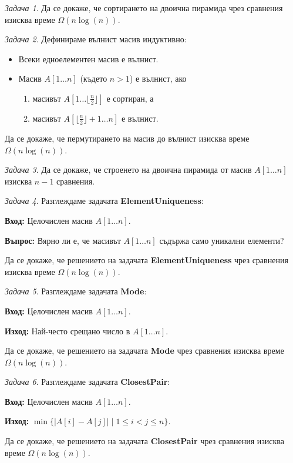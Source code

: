 \documentclass{article}
\theoremstyle{definition}
\theoremstyle{plain}
\theoremstyle{remark}
\newtheorem{problem}{Задача}
\theoremstyle{definition}
\begin{document}
\begin{problem}
Да се докаже, че сортирането на двоична пирамида чрез сравнения изисква време $\Omega(n \log(n))$.
\end{problem}

\begin{problem}
Дефинираме вълнист масив индуктивно:
\begin{itemize}
    \item Всеки едноелементен масив е вълнист.
    \item Масив $A[1 \dots n]$ (където $n > 1$) е вълнист, ако
          \begin{enumerate}
              \item масивът $A[1 \dots \lfloor \frac{n}{2} \rfloor]$ е сортиран, а
              \item масивът $A[\lfloor \frac{n}{2} \rfloor + 1 \dots n]$ е вълнист.
          \end{enumerate}
\end{itemize}
Да се докаже, че пермутирането на масив до вълнист изисква време $\Omega(n \log(n))$.
\end{problem}

\begin{problem}
Да се докаже, че строенето на двоична пирамида от масив $A[1 \dots n]$ изисква $n - 1$ сравнения.
\end{problem}

\begin{problem}
Разглеждаме задачата \textbf{ElementUniqueness}:

\vspace*{2mm}
\textbf{Вход:} Целочислен масив $A[1 \dots n]$.

\textbf{Въпрос:} Вярно ли е, че масивът $A[1 \dots n]$ съдържа само уникални елементи?
\vspace*{2mm}

Да се докаже, че решението на задачата \textbf{ElementUniqueness} чрез сравнения изисква време $\Omega(n \log(n))$.
\end{problem}

\begin{problem}
Разглеждаме задачата \textbf{Mode}:

\vspace*{2mm}
\textbf{Вход:} Целочислен масив $A[1 \dots n]$.

\textbf{Изход:} Най-често срещано число в $A[1 \dots n]$.
\vspace*{2mm}

Да се докаже, че решението на задачата \textbf{Mode} чрез сравнения изисква време $\Omega(n \log(n))$.
\end{problem}

\begin{problem}
Разглеждаме задачата \textbf{ClosestPair}:

\vspace*{2mm}
\textbf{Вход:} Целочислен масив $A[1 \dots n]$.

\textbf{Изход:} $\min \{ |A[i] - A[j]| \mid 1 \leq i < j \leq n \}$.
\vspace*{2mm}

Да се докаже, че решението на задачата \textbf{ClosestPair} чрез сравнения изисква време $\Omega(n \log(n))$.
\end{problem}
\end{document}
